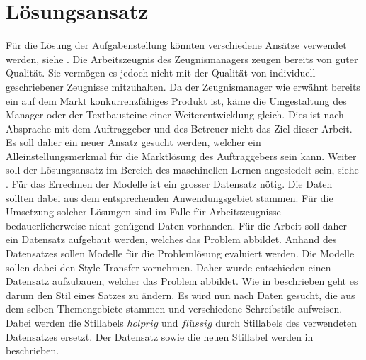 \section{Lösungsansatz}
\label{sec:Lösungsansatz}
Für die Lösung der Aufgabenstellung könnten verschiedene Ansätze verwendet werden, siehe
. Die Arbeitszeugnis des Zeugnismanagers zeugen bereits von guter Qualität. Sie
vermögen es jedoch nicht mit der Qualität von individuell geschriebener Zeugnisse mitzuhalten.
\newline
\newline
Da der Zeugnismanager wie erwähnt bereits ein auf dem Markt konkurrenzfähiges Produkt ist, käme die Umgestaltung des
Manager oder der Textbausteine einer Weiterentwicklung gleich. Dies ist nach Absprache mit dem Auftraggeber und des
Betreuer nicht das Ziel dieser Arbeit. Es soll daher ein neuer Ansatz gesucht werden, welcher ein Alleinstellungsmerkmal
für die Marktlösung des Auftraggebers sein kann. Weiter soll der Lösungsansatz im Bereich des maschinellen Lernen
angesiedelt sein, siehe .
\newline
\newline
Für das Errechnen der Modelle ist ein grosser Datensatz nötig. Die Daten sollten dabei aus dem entsprechenden
Anwendungsgebiet stammen. Für die Umsetzung solcher Lösungen sind im Falle für Arbeitszeugnisse bedauerlicherweise nicht
genügend Daten vorhanden. Für die Arbeit soll daher ein Datensatz aufgebaut werden, welches das Problem abbildet. Anhand
des Datensatzes sollen Modelle für die Problemlösung evaluiert werden. Die Modelle sollen dabei den Style Transfer
vornehmen. Daher wurde entschieden einen Datensatz aufzubauen, welcher das Problem abbildet. Wie in
 beschrieben geht es darum den Stil eines Satzes zu ändern. Es wird nun nach Daten
gesucht, die aus dem selben Themengebiete stammen und verschiedene Schreibstile aufweisen. Dabei werden die Stillabels $
holprig $ und $ flüssig $ durch Stillabels des verwendeten Datensatzes ersetzt. Der Datensatz sowie die neuen Stillabel
werden in  beschrieben.

